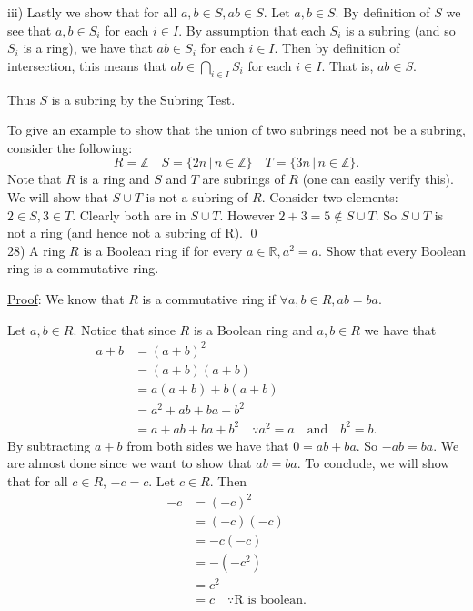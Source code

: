\documentclass{article}
\begin{document}
iii) Lastly we show that for all $a, b \in S, ab \in S$. Let $a, b \in S$. By definition of $S$ we see that $a, b \in S_i$ for each $i \in I$. By assumption that each $S_i$ is a subring (and so $S_i$ is a ring), we have that $ab \in S_i$ for each $i \in I$. Then by definition of intersection, this means that $ab \in \underset{i \in I}{\bigcap} S_i$ for each $i \in I$. That is, $ab \in S$.

Thus $S$ is a subring by the Subring Test.

To give an example to show that the union of two subrings need not be a subring, consider the following:
$$R = \mathbb{Z} \quad S = \{2n \, \vert \, n \in \mathbb{Z} \} \quad T = \{3n \, \vert \, n \in \mathbb{Z} \}.$$
Note that $R$ is a ring and $S$ and $T$ are subrings of $R$ (one can easily verify this). We will show that $S \cup T$ is not a subring of $R$. Consider two elements: $2 \in S, 3 \in T$. Clearly both are in $S \cup T$. However $2 + 3 = 5 \not \in S \cup T$. So $S \cup T$ is not a ring (and hence not a subring of R). \qed \\

28) A ring $R$ is a Boolean ring if for every $a \in \mathbb{R}, a^2 = a$. Show that every Boolean ring is a commutative ring.

\underline{Proof}: We know that $R$ is a commutative ring if $\forall a, b \in R, ab = ba$.

Let $a, b \in R$. Notice that since $R$ is a Boolean ring and $a, b \in R$ we have that
\begin{align*}
	a + b &= (a+b)^2 \\
	&= (a+b)(a+b) \\
	&= a(a+b) + b(a+b) \\
	&= a^2 + ab + ba + b^2 \\
	&= a + ab + ba + b^2 \quad \because a^2 = a \quad \text{and} \quad b^2 = b.
\end{align*}
By subtracting $a + b$ from both sides we have that $0 = ab + ba$. So $-ab = ba$. We are almost done since we want to show that $ab = ba$. To conclude, we will show that for all $c \in R$, $-c = c$. Let $c \in R$. Then
\begin{align*}
	-c &= (-c)^2 \\
	&= (-c)(-c) \\
	&= -c(-c) \\
	&= -(-c^2) \\
	&= c^2 \\
	&= c \quad \because \text{R is boolean}.
\end{align*}
\end{document}
